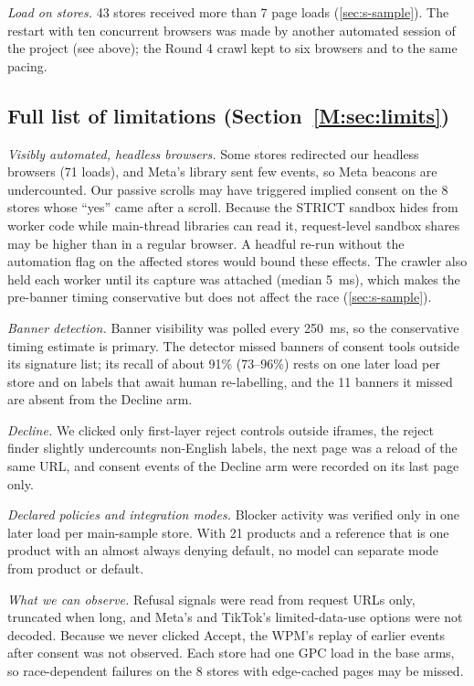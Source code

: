 \documentclass[preprint,11pt,authoryear,a4paper]{elsarticle}
\begin{document}
\emph{Load on stores.} 43 stores received more than 7 page loads (\ref{sec:s-sample}). The restart with ten concurrent browsers was made by another automated session of the project (see above); the Round 4 crawl kept to six browsers and to the same pacing.

\subsection*{Full list of limitations (Section~\ref*{M:sec:limits})}

\emph{Visibly automated, headless browsers.} Some stores redirected our headless browsers (71 loads), and Meta's library sent few events, so Meta beacons are undercounted. Our passive scrolls may have triggered implied consent on the 8 stores whose ``yes'' came after a scroll. Because the STRICT sandbox hides  from worker code while main-thread libraries can read it, request-level sandbox shares may be higher than in a regular browser. A headful re-run without the automation flag on the affected stores would bound these effects. The crawler also held each worker until its capture was attached (median 5~ms), which makes the pre-banner timing conservative but does not affect the race (\ref{sec:s-sample}).

\emph{Banner detection.} Banner visibility was polled every 250~ms, so the conservative timing estimate is primary. The detector missed banners of consent tools outside its signature list; its recall of about 91\% (73--96\%) rests on one later load per store and on labels that await human re-labelling, and the 11 banners it missed are absent from the Decline arm.

\emph{Decline.} We clicked only first-layer reject controls outside iframes, the reject finder slightly undercounts non-English labels, the next page was a reload of the same URL, and consent events of the Decline arm were recorded on its last page only.

\emph{Declared policies and integration modes.} Blocker activity was verified only in one later load per main-sample store. With 21 products and a reference that is one product with an almost always denying default, no model can separate mode from product or default.

\emph{What we can observe.} Refusal signals were read from request URLs only, truncated when long, and Meta's and TikTok's limited-data-use options were not decoded. Because we never clicked Accept, the WPM's replay of earlier events after consent was not observed. Each store had one GPC load in the base arms, so race-dependent failures on the 8 stores with edge-cached pages may be missed.
\end{document}
